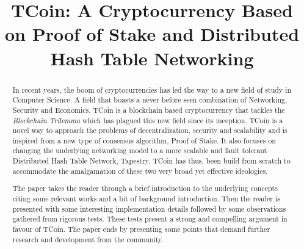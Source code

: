 \documentclass[conference,a4paper,12pt]{IEEEtran}
\begin{document}
\title{TCoin: A Cryptocurrency Based on Proof of Stake and Distributed Hash Table Networking}

\author{
\and
{}
\and
{}
}

\maketitle

\begin{abstract}
In recent years, the boom of cryptocurrencies has led the way to a new field of study in Computer Science. A field that boasts a never before seen combination of Networking, Security and Economics. TCoin is a blockchain based cryptocurrency that tackles the \textit{Blockchain Trilemma} which has plagued this new field since its inception. TCoin is a novel way to approach the problems of decentralization, security and scalability and is inspired from a new type of consensus algorithm, Proof of Stake. It also focuses on changing the underlying networking model to a more scalable and fault tolerant Distributed Hash Table Network, Tapestry. TCoin has thus, been build from scratch to accommodate the amalgamation of these two very broad yet effective ideologies.
	
	The paper takes the reader through a brief introduction to the underlying concepts citing some relevant works and a bit of background introduction. Then the reader is presented with some interesting implementation details followed by some observations gathered from rigorous tests. These tests present a strong and compelling argument in favour of  TCoin. The paper ends by presenting some points that demand further research and development from the community.
\end{abstract}
\end{document}
